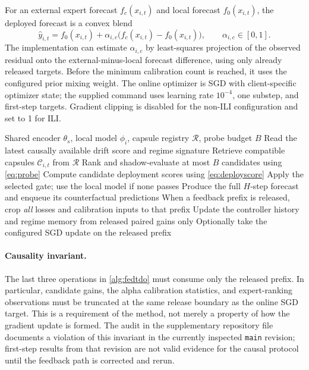 \documentclass{article}
\newcommand{\method}{\textsc{FedTDO}}
\theoremstyle{definition}
\begin{document}
For an external expert forecast \(f_c(x_{i,t})\) and local forecast \(f_0(x_{i,t})\), the deployed forecast is a convex blend
\begin{equation}
\widehat y_{i,t}
 =
 f_0(x_{i,t})
 + \alpha_{i,c}
   \bigl(f_c(x_{i,t})-f_0(x_{i,t})\bigr),
 \qquad \alpha_{i,c}\in[0,1].
 \label{eq:blend}
\end{equation}
The implementation can estimate \(\alpha_{i,c}\) by least-squares projection of the observed residual onto the external-minus-local forecast difference, using only already released targets. Before the minimum calibration count is reached, it uses the configured prior mixing weight. The online optimizer is SGD with client-specific optimizer state; the supplied command uses learning rate \(10^{-4}\), one substep, and first-step targets. Gradient clipping is disabled for the non-ILI configuration and set to 1 for ILI.

\begin{algorithm}[t]
\caption{Client-side \method\ transfer and prequential update}
\label{alg:fedtdo}
\begin{algorithmic}[1]
\REQUIRE Shared encoder \(\theta_s\), local model \(\phi_i\), capsule registry \(\mathcal R\), probe budget \(B\)
  \STATE Read the latest causally available drift score and regime signature
  \STATE Retrieve compatible capsules \(\mathcal C_{i,t}\) from \(\mathcal R\)
  \STATE Rank and shadow-evaluate at most \(B\) candidates using \cref{eq:probe}
  \STATE Compute candidate deployment scores using \cref{eq:deployscore}
  \STATE Apply the selected gate; use the local model if none passes
  \STATE Produce the full \(H\)-step forecast and enqueue its counterfactual predictions
  \STATE When a feedback prefix is released, crop \emph{all} losses and calibration inputs to that prefix
  \STATE Update the controller history and regime memory from released paired gains only
  \STATE Optionally take the configured SGD update on the released prefix
\ENDFOR
\end{algorithmic}
\end{algorithm}

\paragraph{Causality invariant.}
The last three operations in \cref{alg:fedtdo} must consume only the released prefix. In particular, candidate gains, the alpha calibration statistics, and expert-ranking observations must be truncated at the same release boundary as the online SGD target. This is a requirement of the method, not merely a property of how the gradient update is formed. The audit in the supplementary repository file documents a violation of this invariant in the currently inspected \texttt{main} revision; first-step results from that revision are not valid evidence for the causal protocol until the feedback path is corrected and rerun.
\end{document}

